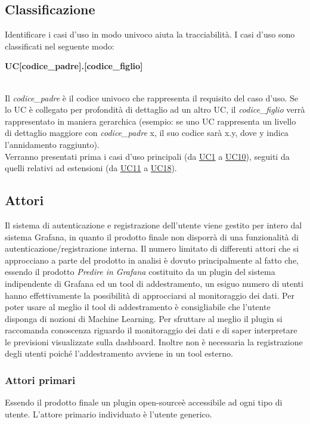\subsection{Classificazione}
Identificare i casi d'uso in modo univoco aiuta la tracciabilità. I casi d'uso sono classificati nel seguente modo: \\
\centerline{\textbf{UC[codice\_padre].[codice\_figlio]}} \\
Il \textit{codice\_padre} è il codice univoco che rappresenta il requisito del caso d'uso. Se lo UC è collegato per profondità di dettaglio ad un altro UC, il \textit{codice\_figlio} verrà rappresentato in maniera gerarchica (esempio: se uno UC rappresenta un livello di dettaglio maggiore con \textit{codice\_padre} x, il suo codice sarà x.y, dove y indica l'annidamento raggiunto). \\ Verranno presentati prima i casi d'uso principali (da \hyperref[par:UC1]{UC1} a \hyperref[par:UC10]{UC10}), seguiti da quelli relativi ad estensioni (da \hyperref[par:UC11]{UC11} a \hyperref[par:UC18]{UC18}).

	\subsection{Attori}
Il sistema di autenticazione e registrazione dell'utente viene gestito per intero dal sistema Grafana, in quanto il prodotto finale non disporrà di una funzionalità di autenticazione/registrazione interna.									
Il numero limitato di differenti attori che si approcciano a parte del prodotto in analisi è dovuto principalmente al fatto che, essendo il prodotto \emph{Predire in Grafana} costituito da un plugin del sistema indipendente di Grafana ed un tool di addestramento, un esiguo numero di utenti hanno effettivamente la possibilità di approcciarsi al monitoraggio dei dati.
Per poter usare al meglio il tool di addestramento è consigliabile che l'utente disponga di nozioni di Machine Learning. Per sfruttare al meglio il plugin si raccomanda conoscenza riguardo il monitoraggio dei dati e di saper interpretare le previsioni visualizzate sulla dashboard. 
Inoltre non è necessaria la  registrazione degli utenti poiché l'addestramento avviene in un tool esterno.


	\subsubsection{Attori primari}
Essendo il prodotto finale un plugin open-source\glo è accessibile ad ogni tipo di utente. L'attore primario individuato è l'utente generico.
